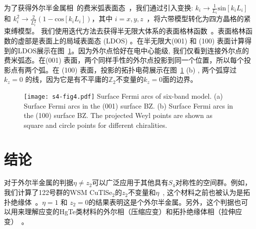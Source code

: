 
为了获得外尔半金属相\wsm~的费米弧表面态~\citep{Wan2011,xu2011chern}，我们通过引入变换: $k_{i}\rightarrow \frac{1}{L_{i}}\text{sin}[k_{i}L_{i}]$ 和 $k_{i}^2\rightarrow\frac{2}{L_{i}^2}(1-\text{cos}[k_{i}L_{i}])$，其中 $i=x,y,z$~\citep{wang2013three}，将六带模型转化为四方晶格的紧束缚模型。
我们使用迭代方法去获得半无限大体系的表面格林函数~\citep{WU2017,Sancho_1985}。表面格林函数的虚部是表面上的局域表面态 (LDOS) 。在半无限大(001) 和 (100) 表面计算得到的LDOS展示在图~\ref{fig:5-4}。因为外尔点恰好在电中心能级, 我们仅看到连接外尔点的费米弧态。在(001) 表面，两个同样手性的外尔点投影到同一个位置，所以每个投影点有两个弧。在 (100) 表面，投影的拓扑电荷展示在图~\ref{fig:5-4} (b) , 两个弧穿过$k_z=0$ 的线，因为它是有不平庸的$\mathbb Z_2$不变量的$k_z=0$面的边界。
\begin{figure}[!hb]
\centering
\texttt{[image: s4-fig4.pdf]}
{
Surface Fermi arcs of six-band model. (a) Surface Fermi arcs in the (001) surface BZ. (b) Surface Fermi arcs in the (100) surface BZ. The projected Weyl points are shown as square and circle points for different chiralities. ~\citep{Qians4}
}
\label{fig:5-4}
\end{figure}


\section{结论}


对于外尔半金属的判据$\eta\neq z_2$可以广泛应用于其他具有$S_4$对称性的空间群。例如，我们计算了122号群的WSM CuTlSe$_2$的$z_2$不变量和$\eta$~\citep{Haijun2016}, 这个材料之前也被认为是拓扑绝缘体~\citep{Feng2011}。$\eta=1$ 和 $z_2=0$的结果表明这是个外尔半金属。另外，这个判据也可以用来理解应变的HgTe类材料的外尔相（压缩应变）和拓扑绝缘体相（拉伸应变）~\citep{HgTenc2016}。

